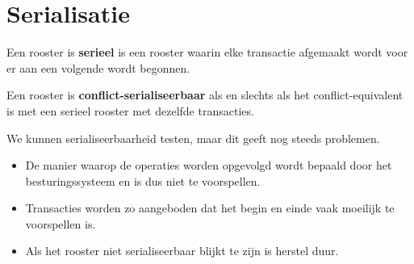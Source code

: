 \documentclass[transacties.tex]{subfiles}
\begin{document}
\section{Serialisatie}
\begin{de}
Een rooster is \textbf{serieel} is een rooster waarin elke transactie afgemaakt wordt voor er aan een volgende wordt begonnen.
\end{de}
\begin{de}
Een rooster is \textbf{conflict-serialiseerbaar} als en slechts als het conflict-equivalent is met een serieel rooster met dezelfde transacties.
\end{de}
We kunnen serialiseerbaarheid testen, maar dit geeft nog steeds problemen.
\begin{itemize}
\item De manier waarop de operaties worden opgevolgd wordt bepaald door het besturingssysteem en is dus niet te voorspellen.
\item Transacties worden zo aangeboden dat het begin en einde vaak moeilijk te voorspellen is.
\item Als het rooster niet serialiseerbaar blijkt te zijn is herstel duur.
\end{itemize}
\end{document}
